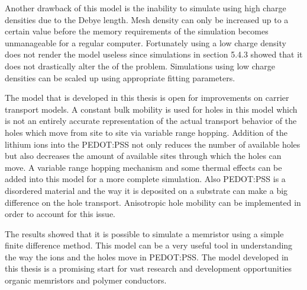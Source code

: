 \begin{doublespace}
Another drawback of this model is the inability to simulate using high charge densities due to the Debye length. Mesh density can only be increased up to a certain value before the memory requirements of the simulation becomes unmanageable for a regular computer. Fortunately using a low charge density does not render the model useless since simulations in section 5.4.3 showed that it does not drastically alter the  of the problem. Simulations using low charge densities can be scaled up using appropriate fitting parameters.  
 
The model that is developed in this thesis is open for improvements on carrier transport models. A constant bulk mobility is used for holes in this model which is not an entirely accurate representation of the actual transport behavior of the holes which move from site to site via variable range hopping. Addition of the lithium ions into the PEDOT:PSS not only reduces the number of available holes but also decreases the amount of available sites through which the holes can move. A variable range hopping mechanism and some thermal effects can be added into this model for a more complete simulation. Also PEDOT:PSS is a disordered material and the way it is deposited on a substrate can make a big difference on the hole transport. Anisotropic hole mobility can be implemented in order to account for this issue.

The results showed that it is possible to simulate a memristor using a simple finite difference method. This model can be a very useful tool in understanding the way the ions and the holes move in PEDOT:PSS. The model developed in this thesis is a promising start for  vast research and development opportunities  organic memristors and  polymer conductors.

\end{doublespace}

